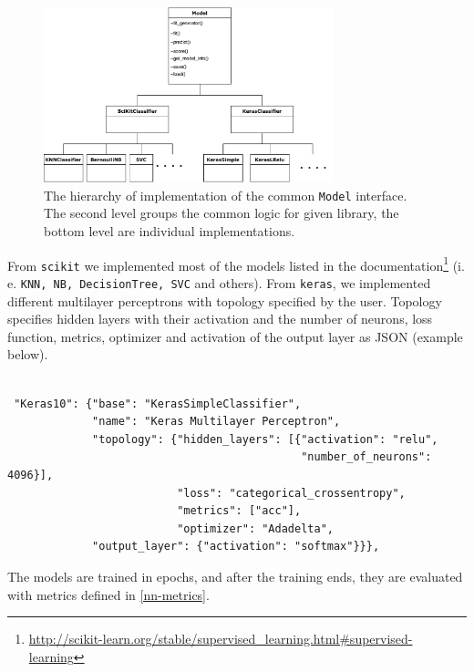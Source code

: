 \begin{figure}[H]

\centering
\includegraphics[width=0.75\textwidth]{tex/images/model_inheritance}
\caption{The hierarchy of implementation of the common \texttt{Model} interface. The second level groups the common logic for given library, the bottom level are individual implementations.}
\label{model-inheritance}

\end{figure}

From \texttt{scikit} we implemented most of the models listed in the documentation\footnote{\url{http://scikit-learn.org/stable/supervised\_learning.html\#supervised-learning}} (i. e. \texttt{KNN, NB, DecisionTree, SVC} and others). From \texttt{keras}, we implemented different multilayer perceptrons with topology specified by the user. Topology specifies hidden layers with their activation and the number of neurons, loss function, metrics, optimizer and activation of the output layer as JSON (example below).

\label{models-json}
\begin{verbatim}

 "Keras10": {"base": "KerasSimpleClassifier",
             "name": "Keras Multilayer Perceptron",
             "topology": {"hidden_layers": [{"activation": "relu",
                                             "number_of_neurons": 4096}],
                          "loss": "categorical_crossentropy",
                          "metrics": ["acc"],
                          "optimizer": "Adadelta",
             "output_layer": {"activation": "softmax"}}},

\end{verbatim}

\noindent
The models are trained in epochs, and after the training ends, they are evaluated with metrics defined in \autoref{nn-metrics}.

